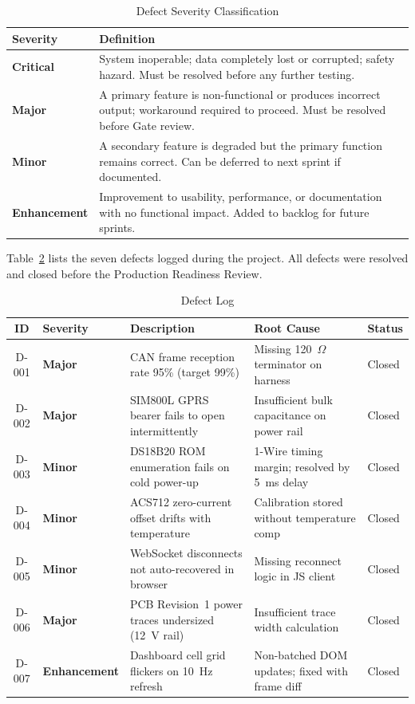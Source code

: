 \begin{table}[H]
\centering
\caption{Defect Severity Classification}
\label{tab:defect-severity}
\small
\begin{tabular}{>{\bfseries}p{2.8cm} p{9.0cm}}
\toprule
Severity & Definition \\
\midrule
Critical    & System inoperable; data completely lost or corrupted; safety hazard. Must be resolved before any further testing. \\
Major       & A primary feature is non-functional or produces incorrect output; workaround required to proceed. Must be resolved before Gate review. \\
Minor       & A secondary feature is degraded but the primary function remains correct. Can be deferred to next sprint if documented. \\
Enhancement & Improvement to usability, performance, or documentation with no functional impact. Added to backlog for future sprints. \\
\bottomrule
\end{tabular}
\end{table}

Table~\ref{tab:defect-log} lists the seven defects logged during the project. All defects were resolved and closed before the Production Readiness Review.

\begin{table}[H]
\centering
\caption{Defect Log}
\label{tab:defect-log}
\small
\begin{tabular}{c >{\bfseries}p{1.6cm} p{5.0cm} p{2.2cm} p{1.6cm}}
\toprule
ID & Severity & Description & Root Cause & Status \\
\midrule
D-001 & Major    & CAN frame reception rate 95\% (target 99\%)         & Missing 120~$\Omega$ terminator on harness  & Closed \\
D-002 & Major    & SIM800L GPRS bearer fails to open intermittently    & Insufficient bulk capacitance on power rail & Closed \\
D-003 & Minor    & DS18B20 ROM enumeration fails on cold power-up      & 1-Wire timing margin; resolved by 5~ms delay & Closed \\
D-004 & Minor    & ACS712 zero-current offset drifts with temperature  & Calibration stored without temperature comp & Closed \\
D-005 & Minor    & WebSocket disconnects not auto-recovered in browser & Missing reconnect logic in JS client         & Closed \\
D-006 & Major    & PCB Revision~1 power traces undersized (12~V rail)  & Insufficient trace width calculation         & Closed \\
D-007 & Enhancement & Dashboard cell grid flickers on 10~Hz refresh    & Non-batched DOM updates; fixed with frame diff & Closed \\
\bottomrule
\end{tabular}
\end{table}
